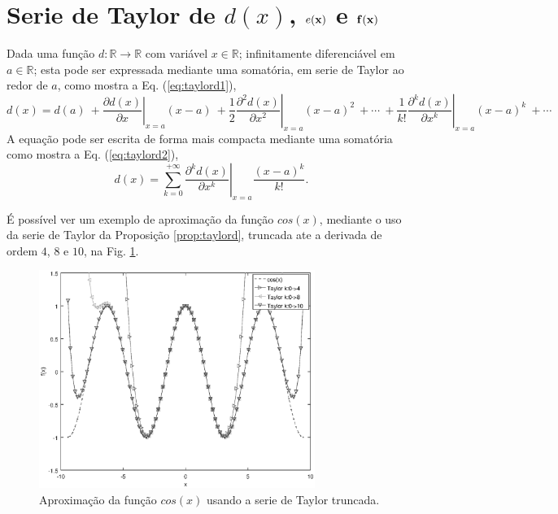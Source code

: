 \section{Serie de Taylor de $d(x)$, $e(\VECTOR{x})$ e $\VECTOR{f}(\VECTOR{x})$}
\label{def:taylor}

\begin{proposition}\label{prop:taylord}
Dada uma função $d:\mathbb{R}\rightarrow \mathbb{R}$ com variável $x \in \mathbb{R}$;
infinitamente diferenciável em $a \in \mathbb{R}$;
esta pode ser expressada mediante uma somatória, em serie de Taylor \cite{Taylor} \FALTAREFERENCIA ao redor de $a$, como
mostra a Eq. (\ref{eq:taylord1}),
\begin{equation}\label{eq:taylord1}
  d(x)=d(a)
      ~+\left.\frac{\partial   d(x)}{\partial x  }\right|_{x=a}(x-a)
      ~+\frac{1}{2}\left.\frac{\partial^2 d(x)}{\partial x^2}\right|_{x=a}(x-a)^{2}
      ~+\cdots 
      ~+\frac{1}{k!}\left.\frac{\partial^k d(x)}{\partial x^k}\right|_{x=a}(x-a)^{k}
      ~+\cdots 
\end{equation}
A equação pode ser escrita de forma mais compacta mediante uma somatória  como mostra a Eq. (\ref{eq:taylord2}),
\begin{equation}\label{eq:taylord2}
  d(x)=\sum\limits_{k=0}^{+\infty} \left.\frac{\partial^k d(x)}{\partial x^k}\right|_{x=a}\frac{(x-a)^{k}}{k!}.
\end{equation}
\end{proposition}

É possível ver um exemplo de aproximação da função $cos(x)$, 
mediante o uso da serie de Taylor da Proposição \ref{prop:taylord}, 
truncada ate a derivada de ordem $4$, $8$ e $10$, na Fig. \ref{fig:taylore}.
\begin{figure}[!h]
  \centering
    \includegraphics[width=0.8\textwidth]{chapters/funcoes/mcode/taylore.eps}
  \caption{Aproximação da função $cos(x)$ usando a serie de Taylor truncada.}
    \label{fig:taylore}
\end{figure}
 
